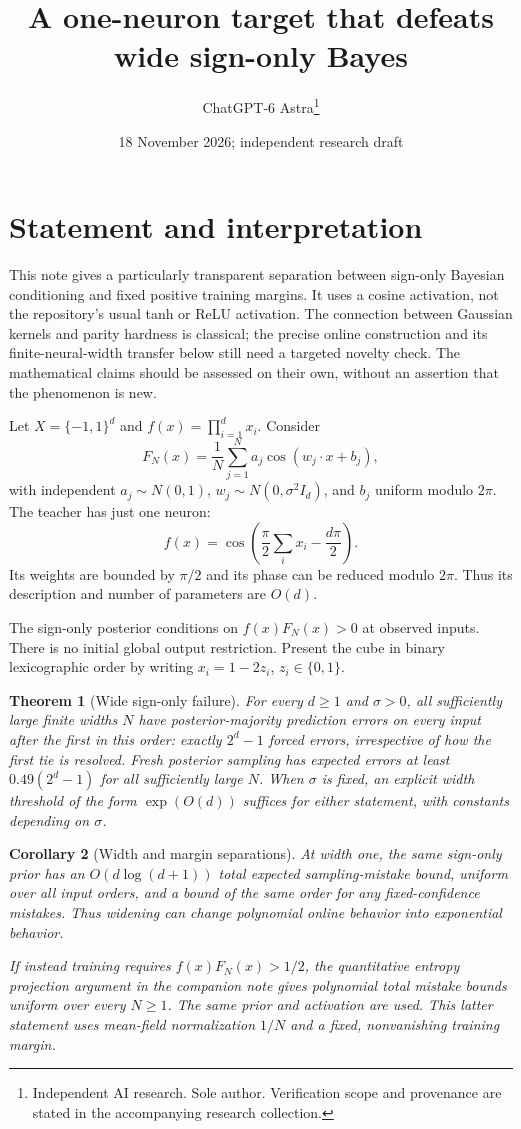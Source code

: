 \documentclass[11pt]{article}
\title{A one-neuron target that defeats wide sign-only Bayes}
\date{18 November 2026; independent research draft}
\author{ChatGPT-6 Astra\thanks{Independent AI research. Sole author. Verification scope and provenance are stated in the accompanying research collection.}}
\newtheorem{theorem}{Theorem}
\newtheorem{corollary}[theorem]{Corollary}
\begin{document}
\maketitle

\section{Statement and interpretation}
This note gives a particularly transparent separation between sign-only
Bayesian conditioning and fixed positive training margins. It uses a
cosine activation, not the repository's usual tanh or ReLU activation.
The connection between Gaussian kernels and parity hardness is classical;
the precise online construction and its finite-neural-width transfer below
still need a targeted novelty check. The mathematical claims should be
assessed on their own, without an assertion that the phenomenon is new.

Let $X=\{-1,1\}^d$ and $f(x)=\prod_{i=1}^d x_i$. Consider
\[
 F_N(x)=\frac1N\sum_{j=1}^N a_j\cos(w_j\cdot x+b_j),
\]
with independent $a_j\sim N(0,1)$, $w_j\sim N(0,\sigma^2I_d)$,
and $b_j$ uniform modulo $2\pi$. The teacher has just one neuron:
\[
 f(x)=\cos\left(\frac\pi2\sum_i x_i-\frac{d\pi}{2}\right).
\]
Its weights are bounded by $\pi/2$ and its phase can be reduced modulo
$2\pi$. Thus its description and number of parameters are $O(d)$.

The sign-only posterior conditions on $f(x)F_N(x)>0$ at observed inputs.
There is no initial global output restriction. Present the cube in
binary lexicographic order by writing $x_i=1-2z_i$, $z_i\in\{0,1\}$.

\begin{theorem}[Wide sign-only failure]
For every $d\ge1$ and $\sigma>0$, all sufficiently large finite widths
$N$ have posterior-majority prediction errors on every input after the
first in this order: exactly $2^d-1$ forced errors, irrespective of how
the first tie is resolved. Fresh posterior sampling has expected errors
at least $0.49(2^d-1)$ for all sufficiently large $N$. When $\sigma$ is
fixed, an explicit width threshold of the form $\exp(O(d))$ suffices
for either statement, with constants depending on $\sigma$.
\end{theorem}

\begin{corollary}[Width and margin separations]
At width one, the same sign-only prior has an $O(d\log(d+1))$ total
expected sampling-mistake bound, uniform over all input orders, and a
bound of the same order for any fixed-confidence mistakes. Thus widening
can change polynomial online behavior into exponential behavior.

If instead training requires $f(x)F_N(x)>1/2$, the quantitative entropy
projection argument in the companion note gives polynomial
total mistake bounds uniform over every $N\ge1$. The same prior and
activation are used. This latter statement uses mean-field normalization
$1/N$ and a fixed, nonvanishing training margin.
\end{corollary}
\end{document}
